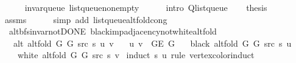 \begin{isabellebody}
\ \ \ \ \isamarkupfalse%
\ invar{\isacharunderscore}{\kern0pt}queue\ list{\isacharunderscore}{\kern0pt}queue{\isacharunderscore}{\kern0pt}non{\isacharunderscore}{\kern0pt}empty\isanewline
\ \ \ \ \isamarkupfalse%
\ {\isacharparenleft}{\kern0pt}intro\ Q{\isachardot}{\kern0pt}list{\isacharunderscore}{\kern0pt}queue{\isacharparenright}{\kern0pt}\isanewline
\ \ \isamarkupfalse%
\ {\isacharquery}{\kern0pt}thesis\isanewline
\ \ \ \ \isamarkupfalse%
\ assms\isanewline
\ \ \ \ \isamarkupfalse%
\ {\isacharparenleft}{\kern0pt}simp\ add{\isacharcolon}{\kern0pt}\ list{\isacharunderscore}{\kern0pt}queue{\isacharunderscore}{\kern0pt}alt{\isacharunderscore}{\kern0pt}fold{\isacharunderscore}{\kern0pt}cong{\isacharparenright}{\kern0pt}\isanewline
{}\isamarkupfalse%
%
\endisatagproof
{\isafoldproof}%
%
\isadelimproof
\isanewline
%
\endisadelimproof
\isanewline
{}\isamarkupfalse%
\ {\isacharparenleft}{\kern0pt}\ alt{\isacharunderscore}{\kern0pt}bfs{\isacharunderscore}{\kern0pt}invar{\isacharunderscore}{\kern0pt}not{\isacharunderscore}{\kern0pt}DONE{\isacharparenright}{\kern0pt}\ black{\isacharunderscore}{\kern0pt}imp{\isacharunderscore}{\kern0pt}adjacency{\isacharunderscore}{\kern0pt}not{\isacharunderscore}{\kern0pt}white{\isacharunderscore}{\kern0pt}alt{\isacharunderscore}{\kern0pt}fold{\isacharcolon}{\kern0pt}\isanewline
\ \ \ {\isachardoublequoteopen}alt\ {\isacharparenleft}{\kern0pt}alt{\isacharunderscore}{\kern0pt}fold\ G{}\ G{}\ src\ s{\isacharparenright}{\kern0pt}\ u\ v{\isachardoublequoteclose}\isanewline
\ \ \ {\isachardoublequoteopen}{\isacharbraceleft}{\kern0pt}u{\isacharcomma}{\kern0pt}\ v{\isacharbraceright}{\kern0pt}\ {\isasymin}\ G{\isachardot}{\kern0pt}E\ G{\isachardoublequoteclose}\isanewline
\ \ \ {\isachardoublequoteopen}black\ {\isacharparenleft}{\kern0pt}alt{\isacharunderscore}{\kern0pt}fold\ G{}\ G{}\ src\ s{\isacharparenright}{\kern0pt}\ u{\isachardoublequoteclose}\isanewline
\ \ \ {\isachardoublequoteopen}{\isasymnot}\ white\ {\isacharparenleft}{\kern0pt}alt{\isacharunderscore}{\kern0pt}fold\ G{}\ G{}\ src\ s{\isacharparenright}{\kern0pt}\ v{\isachardoublequoteclose}\isanewline
%
\isadelimproof
%
\endisadelimproof
%
\isatagproof
{}\isamarkupfalse%
\ {\isacharparenleft}{\kern0pt}induct\ s\ u\ rule{\isacharcolon}{\kern0pt}\ vertex{\isacharunderscore}{\kern0pt}color{\isacharunderscore}{\kern0pt}induct{\isacharparenright}{\kern0pt}\isanewline

\end{isabellebody}
